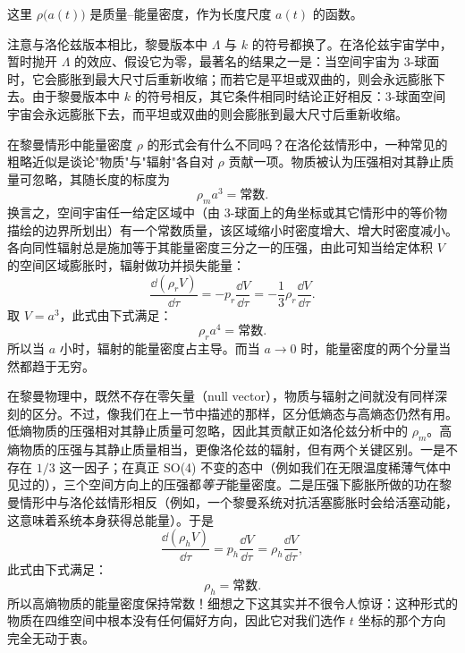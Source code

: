 这里 $\rho\bigl(a(t)\bigr)$ 是质量--能量密度，作为长度尺度 $a(t)$ 的函数。

注意与洛伦兹版本相比，黎曼版本中 $\Lambda$ 与 $k$ 的符号都换了。在洛伦兹宇宙学中，暂时抛开 $\Lambda$ 的效应、假设它为零，最著名的结果之一是：当空间宇宙为 3-球面时，它会膨胀到最大尺寸后重新收缩；而若它是平坦或双曲的，则会永远膨胀下去。由于黎曼版本中 $k$ 的符号相反，其它条件相同时结论正好相反：3-球面空间宇宙会永远膨胀下去，而平坦或双曲的则会膨胀到最大尺寸后重新收缩。

在黎曼情形中能量密度 $\rho$ 的形式会有什么不同吗？在洛伦兹情形中，一种常见的粗略近似是谈论"物质"与"辐射"各自对 $\rho$ 贡献一项。物质被认为压强相对其静止质量可忽略，其随长度的标度为
\begin{equation*}
\rho_{m}a^{3}=\text{常数}.
\end{equation*}
换言之，空间宇宙任一给定区域中（由 3-球面上的角坐标或其它情形中的等价物描绘的边界所划出）有一个常数质量，该区域缩小时密度增大、增大时密度减小。各向同性辐射总是施加等于其能量密度三分之一的压强，由此可知当给定体积 $V$ 的空间区域膨胀时，辐射做功并损失能量：
\begin{equation*}
\frac{\dd(\rho_{r}V)}{\dd\tau}=-p_{r}\frac{\dd V}{\dd\tau}=-\frac{1}{3}\rho_{r}\frac{\dd V}{\dd\tau}.
\end{equation*}
取 $V=a^{3}$，此式由下式满足：
\begin{equation*}
\rho_{r}a^{4}=\text{常数}.
\end{equation*}
所以当 $a$ 小时，辐射的能量密度占主导。而当 $a\to0$ 时，能量密度的两个分量当然都趋于无穷。

在黎曼物理中，既然不存在零矢量（null vector），物质与辐射之间就没有同样深刻的区分。不过，像我们在上一节中描述的那样，区分低熵态与高熵态仍然有用。低熵物质的压强相对其静止质量可忽略，因此其贡献正如洛伦兹分析中的 $\rho_{m}$。高熵物质的压强与其静止质量相当，更像洛伦兹的辐射，但有两个关键区别。一是不存在 $1/3$ 这一因子；在真正 SO(4) 不变的态中（例如我们在无限温度稀薄气体中见过的），三个空间方向上的压强都\emph{等于}能量密度。二是压强下膨胀所做的功在黎曼情形中与洛伦兹情形相反（例如，一个黎曼系统对抗活塞膨胀时会给活塞动能，这意味着系统本身获得总能量）。于是
\begin{equation*}
\frac{\dd(\rho_{h}V)}{\dd\tau}=p_{h}\frac{\dd V}{\dd\tau}=\rho_{h}\frac{\dd V}{\dd\tau},
\end{equation*}
此式由下式满足：
\begin{equation*}
\rho_{h}=\text{常数}.
\end{equation*}
所以高熵物质的能量密度保持常数！细想之下这其实并不很令人惊讶：这种形式的物质在四维空间中根本没有任何偏好方向，因此它对我们选作 $t$ 坐标的那个方向完全无动于衷。

